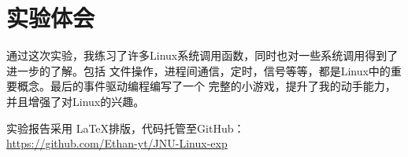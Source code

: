 \documentclass{JNUexp}
\begin{document}
\section{实验体会}
通过这次实验，我练习了许多Linux系统调用函数，同时也对一些系统调用得到了进一步的了解。包括
文件操作，进程间通信，定时，信号等等，都是Linux中的重要概念。最后的事件驱动编程编写了一个
完整的小游戏，提升了我的动手能力，并且增强了对Linux的兴趣。

\vfill

实验报告采用 \LaTeX 排版，代码托管至GitHub：\\
\url{https://github.com/Ethan-yt/JNU-Linux-exp}
\end{document}
